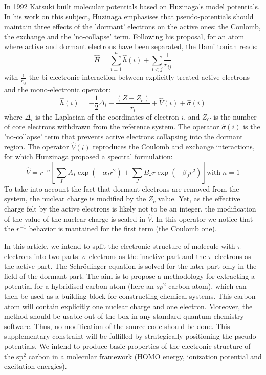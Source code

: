 \documentclass[12pt]{article}
\begin{document}
In 1992 Katsuki built molecular potentials based on Huzinaga's model potentials.\cite{katsuki_molecular_1992,katsuki_spectral_1993}
 In his work on this subject, Huzinaga emphasises that pseudo-potentials should maintain three effects of the
'dormant' electrons on the active ones: the Coulomb, the exchange and the 'no-collapse' term.\cite{huzinaga_effective_1991}
Following his proposal, for an atom where active and dormant electrons have been separated, the Hamiltonian reads:
\begin{equation}
\label{eq:atomicHamiltonian}
\hat{H} = \sum_{i=1}^n \hat{h}(i) +\sum_{i<j}\frac{1}{r_{ij}}
\end{equation}
with $\frac{1}{r_{ij}}$ the bi-electronic interaction
between explicitly treated active electrons and
the mono-electronic operator:
\begin{equation}
\label{eq:monoElectronicOperator}
\hat{h}(i) = -\frac{1}{2}\Delta_i - \frac{(Z-Z_c)}{r_i}+\hat{V}(i) + \hat{\sigma}(i)
\end{equation}
where $\Delta_i$ is the Laplacian of the coordinates of electron $i$, and 
$Z_C$ is the number of core electrons withdrawn from the reference system.
The operator $\hat{\sigma}(i)$ is the 'no-collapse' term that prevents active electrons
collapsing into the dormant region. The operator $\hat{V}(i)$ reproduces the 
Coulomb and exchange interactions, for which Hunzinaga proposed a spectral formulation:
\begin{equation}
\label{eq:HuzinagaMPVersion1Potential}
\hat{V} = r^{-n}\left[\sum_IA_I\exp(-\alpha_I r^2)+\sum_JB_Jr\exp(-\beta_J r^2)\right] \text{with}\;n=1
\end{equation}
To take into account the fact that dormant electrons are removed from the
system, the nuclear charge is modified by the $Z_c$ value.
Yet, as the effective charge felt by the active electrons is likely not to be an integer,
the modification of the value of the nuclear charge is scaled in $\hat{V}$.
In this operator we notice that the \(r^{-1}\) behavior is mantained for the first term 
(the Coulomb one).
%

In this article, we intend to split the electronic structure of molecule with $\pi$
electrons into two parts: $\sigma$ electrons as the inactive part and the $\pi$ electrons
as the active part.
The Schr\"odinger equation is solved for the later part only in the field of the dormant part.
The aim is to propose a methodology for extracting a potential for
a hybridised carbon atom (here an $sp^2$ carbon atom), which can then be
used as a building block for constructing chemical systems. This carbon atom
will contain explicitly one nuclear charge and one electron.
Moreover, the method should be usable 
out of the box in any standard quantum chemistry software.
Thus, no modification of the source code should be done.
This supplementary constraint will be fulfilled by strategically positioning the pseudo-potentials.
We intend to produce basic properties of the electronic structure of the sp$^2$ carbon in a molecular framework (HOMO energy, ionization potential and excitation energies).
\end{document}
